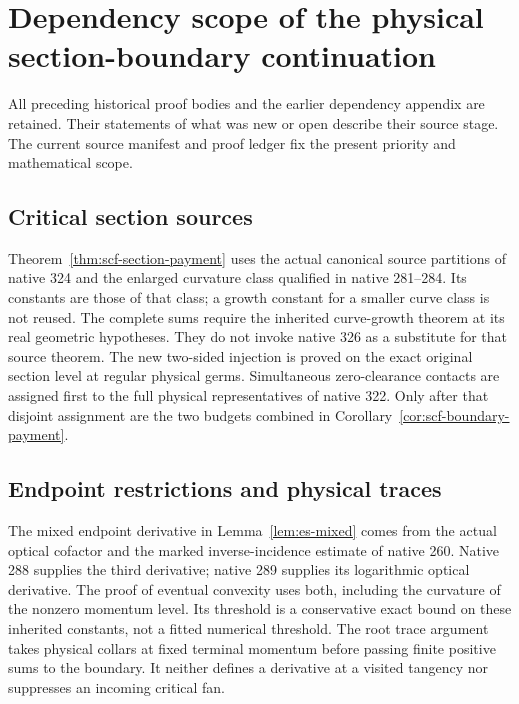 \section{Dependency scope of the physical section-boundary continuation}
\label{sec:current-section-dependencies}
All preceding historical proof bodies and the earlier dependency
appendix are retained. Their statements of what was new or open
describe their source stage. The current source manifest and
proof ledger fix the present priority and mathematical scope.

\subsection*{Critical section sources}
Theorem~\ref{thm:scf-section-payment} uses the actual canonical
source partitions of native 324 and the enlarged curvature
class qualified in native 281--284. Its constants are those
of that class; a growth constant for a smaller curve class
is not reused. The complete sums require the inherited
curve-growth theorem at its real geometric hypotheses.
They do not invoke native 326 as a substitute for that
source theorem. The new two-sided injection is proved on
the exact original section level at regular physical
germs. Simultaneous zero-clearance contacts are assigned
first to the full physical representatives of native 322.
Only after that disjoint assignment are the two budgets
combined in Corollary~\ref{cor:scf-boundary-payment}.

\subsection*{Endpoint restrictions and physical traces}
The mixed endpoint derivative in Lemma~\ref{lem:es-mixed}
comes from the actual optical cofactor and the marked
inverse-incidence estimate of native 260. Native 288
supplies the third derivative; native 289 supplies its
logarithmic optical derivative. The proof of eventual
convexity uses both, including the curvature of the
nonzero momentum level. Its threshold is a conservative
exact bound on these inherited constants, not a fitted
numerical threshold. The root trace argument takes
physical collars at fixed terminal momentum before
passing finite positive sums to the boundary. It neither
defines a derivative at a visited tangency nor suppresses
an incoming critical fan.

